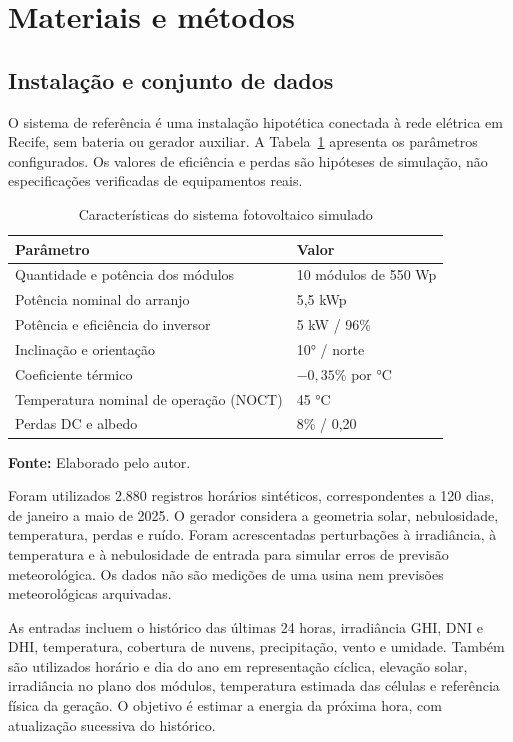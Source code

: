 \section{Materiais e métodos}
\subsection{Instalação e conjunto de dados}
O sistema de referência é uma instalação hipotética conectada à rede elétrica em Recife, sem bateria ou gerador auxiliar. A Tabela~\ref{tab:cfg} apresenta os parâmetros configurados. Os valores de eficiência e perdas são hipóteses de simulação, não especificações verificadas de equipamentos reais.

\begin{table}[!ht]
\centering
\caption{Características do sistema fotovoltaico simulado}
\label{tab:cfg}
\begin{tabularx}{0.94\textwidth}{@{}Xl@{}}\toprule
Parâmetro & Valor\\\midrule
Quantidade e potência dos módulos & 10 módulos de 550 Wp\\
Potência nominal do arranjo & 5,5 kWp\\
Potência e eficiência do inversor & 5 kW / 96\%\\
Inclinação e orientação & 10° / norte\\
Coeficiente térmico & $-0,35$\% por °C\\
Temperatura nominal de operação (NOCT) & 45 °C\\
Perdas DC e albedo & 8\% / 0,20\\
\bottomrule
\end{tabularx}
\textbf{Fonte:} Elaborado pelo autor.
\end{table}

Foram utilizados 2.880 registros horários sintéticos, correspondentes a 120 dias, de janeiro a maio de 2025. O gerador considera a geometria solar, nebulosidade, temperatura, perdas e ruído. Foram acrescentadas perturbações à irradiância, à temperatura e à nebulosidade de entrada para simular erros de previsão meteorológica. Os dados não são medições de uma usina nem previsões meteorológicas arquivadas.

As entradas incluem o histórico das últimas 24 horas, irradiância GHI, DNI e DHI, temperatura, cobertura de nuvens, precipitação, vento e umidade. Também são utilizados horário e dia do ano em representação cíclica, elevação solar, irradiância no plano dos módulos, temperatura estimada das células e referência física da geração. O objetivo é estimar a energia da próxima hora, com atualização sucessiva do histórico.

